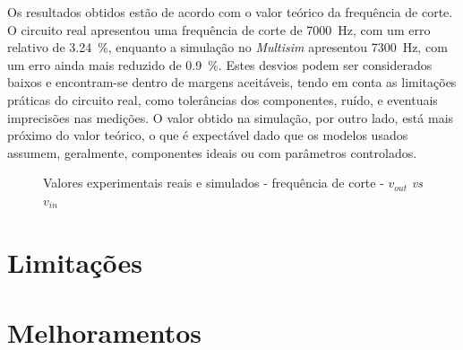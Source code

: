 Os resultados obtidos estão de acordo com o valor teórico da frequência de corte. O circuito real apresentou uma frequência de corte de \SI{7000}{\hertz}, com um erro relativo de \SI{3.24}{\percent}, enquanto a simulação no \textit{Multisim} apresentou \SI{7300}{\hertz}, com um erro ainda mais reduzido de \SI{0.9}{\percent}. Estes desvios podem ser considerados baixos e encontram-se dentro de margens aceitáveis, tendo em conta as limitações práticas do circuito real, como tolerâncias dos componentes, ruído, e eventuais imprecisões nas medições. O valor obtido na simulação, por outro lado, está mais próximo do valor teórico, o que é expectável dado que os modelos usados assumem, geralmente, componentes ideais ou com parâmetros controlados.

\begin{figure}[hbtp]
	\centering%
		\centering
		\qquad
		\caption{Valores experimentais reais e simulados - frequência de corte - $v_{out}$ \textit{vs} $v_{in}$}%
		\label{fig:simulacaovout}%
	\end{figure}


\section{Limitações}
\section{Melhoramentos}


